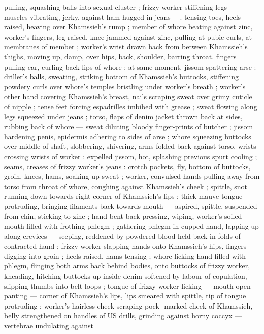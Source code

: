 pulling, squashing balls into sexual cluster ; frizzy worker stiffening 
legs --- muscles vibrating, jerky, against ham hugged in jeans ---. 
tensing toes, heels raised, heaving over Khamssieh's rump ; member 
of whore beating against zinc, worker's fingers, leg raised, knee 
jammed against zinc, pulling at pubic curls, at membranes of 
member ; worker's wrist drawn back from between Khamssieh's 
thighs, moving up, damp, over hips, back, shoulder, barring throat. 
fingers pulling ear, curling back lips of whore : at same moment. 
jissom spattering arse : driller's balls, sweating, striking bottom of 
Khamssieh's buttocks, stiffening powdery curls over whore's temples 
bristling under worker's breath ; worker's other hand covering 
Khamssieh's breast, nails scraping sweat over grimy cuticle of nipple 
; tense feet forcing espadrilles imbibed with grease ; sweat flowing 
along legs squeezed under jeans ; torso, flaps of denim jacket 
thrown back at sides, rubbing back of whore --- sweat diluting 
bloody finger-prints of butcher ; jissom hardening penis, epidermis 
adhering to sides of arse ; whore squeezing buttocks over middle of 
shaft, slobbering, shivering, arms folded back against torso, wrists 
crossing wrists of worker : expelled jissom, hot, splashing previous 
spurt cooling ; seams, creases of frizzy worker's jeans : crotch 
pockets, fly, bottom of buttocks, groin, knees, hams, soaking up 
sweat ; worker, convulsed hands pulling away from torso from throat 
of whore, coughing against Khamssieh's cheek ; spittle, snot 
running down towards right corner of Khamssieh's lips ; thick mauve 
tongue protruding, bringing filaments back towards mouth --- 
aspired, spittle, suspended from chin, sticking to zinc ; hand bent 
back pressing, wiping, worker's soiled mouth filled with frothing 
phlegm ; gathering phlegm in cupped hand, lapping up along 
crevices --- seeping, reddened by powdered blood held back in folds 
of contracted hand ; frizzy worker slapping hands onto Khamssieh's 
hips, fingers digging into groin ; heels raised, hams tensing ; whore 
licking hand filled with phlegm, flinging both arms back behind 
bodies, onto buttocks of frizzy worker, kneading, hitching buttocks 
up inside denim softened by labour of copulation, slipping thumbs 
into belt-loops ; tongue of frizzy worker licking --- mouth open 
panting --- corner of Khamssieh's lips, lips smeared with spittle, tip 
of tongue protruding ; worker's hairless cheek scraping pock- 
marked cheek of Khamssieh, belly strengthened on handles of US 
drills, grinding against horny coccyx --- vertebrae undulating against 
